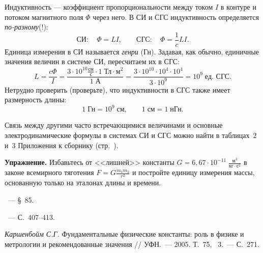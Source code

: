Индуктивность --- коэффициент пропорциональности между током $I$
в контуре и потоком магнитного поля $\Phi$ через него. В СИ и СГС
индуктивность определяется \emph{по-разному}(!):
\[
\text{СИ}:\quad\Phi=LI,\qquad\text{СГС}:\quad\Phi=\frac{1}{c}LI.
\]
Единица измерения в СИ называется \emph{генри} (Гн). Задавая, как
обычно, единичные значения величин в системе СИ, пересчитаем их в
СГС:
\[
L=\frac{c\Phi}{I}=\frac{3\cdot10^{10}\frac{\text{см}}{\text{с}}\cdot1\;\text{Тл}\cdot\text{м}^{2}}{1\;\text{А}}=\frac{3\cdot10^{10}\cdot10^{4}\cdot10^{4}}{3\cdot10^{9}}=10^{9}\;\text{ед. СГС}.
\]
Нетрудно проверить (проверьте), что индуктивности в СГС также имеет
размерность длины:
\[
1\;\text{Гн}=10^{9}\;\text{см},\qquad1\;\text{см}=1\;\text{нГн}.
\]

Связь между другими часто встречающимися величинами и основные
электродинамические формулы в системах СИ и СГС можно найти в
таблицах~2 и~3 Приложения к сборнику (стр.~\pageref{table:SICGS}).

\textbf{Упражнение.} Избавьтесь от <<лишней>> 
константы $G=6{,}67\cdot10^{-11}\;\frac{\text{м}^{3}}{\text{кг}\cdot\text{с}^{2}}$
в законе всемирного тяготения $F=G\frac{m_{1}m_{2}}{r^{2}}$ и постройте
единицу измерения массы, основанную только на эталонах
длины и времени.

\begin{lab:literature}
    \item \SivuhinIII~--- \S~85.
    \item \Kirichenko~--- С.~407--413.
    \item *\textit{Каршенбойм С.Г.} Фундаментальные физические константы: роль
    в физике и метрологии и рекомендованные значения // УФН.~--- 2005. Т.~75, \textnumero~3.~--- С.~271.
\end{lab:literature}



